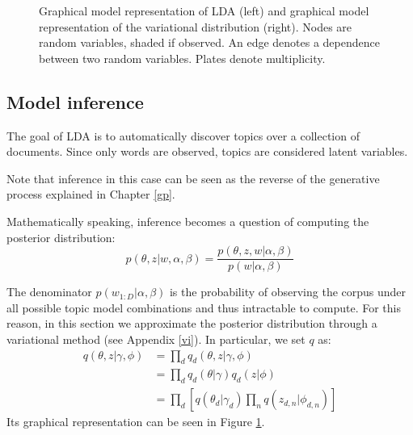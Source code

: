 \begin{figure}[h]
    \centering
    \caption{Graphical model representation of LDA (left) and graphical model representation of the variational distribution (right). Nodes are random variables, shaded if observed. An edge denotes a dependence between two random variables. Plates denote multiplicity.}
    \label{fig:lda}
\end{figure}

\subsection{Model inference} \label{modelinference}
The goal of LDA is to automatically discover topics over a collection of documents.
Since only words are observed, topics are considered latent variables.

Note that inference in this case can be seen as the reverse of the generative process explained in Chapter \ref{gp}.

Mathematically speaking, inference becomes a question of computing the posterior distribution:
$$ p(\theta, z | w, \alpha, \beta) = \frac{p(\theta, z, w | \alpha, \beta)}{p(w| \alpha, \beta)}$$

The denominator $p(w_{1:D} | \alpha, \beta)$ is the probability of observing the corpus under all possible topic model combinations
and thus intractable to compute.
For this reason, in this section we approximate the posterior distribution through a variational method
(see Appendix \ref{vi}).
In particular, we set $q$ as:
\begin{equation*}
    \begin{split}
        q(\theta, z | \gamma, \phi) & = \prod_d q_d(\theta, z | \gamma, \phi) \\
        & = \prod_d q_d(\theta | \gamma) q_d(z | \phi) \\
        & = \prod_d [q(\theta_d | \gamma_d) \prod_n q(z_{d,n} | \phi_{d,n})]
    \end{split}
\end{equation*}
Its graphical representation can be seen in Figure \ref{fig:lda}.

